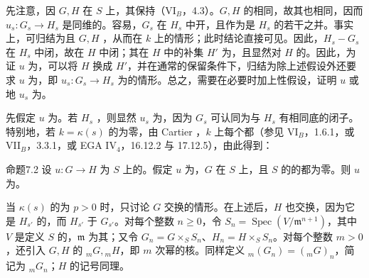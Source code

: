 先注意，因 $G,H$ 在 $S$ 上，其保持（VI$_B$，4.3）。$G,H$ 的相同，故其也相同，因而 $u_s:G_s\to H_s$ 是同维的。容易，$G_s$ 在 $H_s$ 中开，且作为是 $H_s$ 的若干之并。事实上，可归结为且 $G,H$ ，从而在 $k$ 上的情形；此时结论直接可见。因此，$H_s-G_s$ 在 $H_s$ 中闭，故在 $H$ 中闭；其在 $H$ 中的补集 $H'$ 为，且显然对 $H$ 的。因此，为证 $u$ 为，可以将 $H$ 换成 $H'$，并在通常的保留条件下，归结为除上述假设外还要求 $u$ 为，即 $u_s:G_s\to H_s$ 为的情形。总之，需要在必要时加上性假设，证明 $u$ 或地 $u_s$ 为。

先假定 $u$ 为。若 $H_s$ ，则显然 $u_s$ 为，因为 $G_s$ 可认同为与 $H_s$ 有相同底的闭子。特别地，若 $k=\kappa(s)$ 的为零，由 Cartier ，$k$ 上每个都（参见 VI$_B$，1.6.1，或 VII$_B$，3.3.1，或 EGA IV$_4$，16.12.2 与 17.12.5），由此得到：
\begin{SGAresult}{命题}{7.2}
设 $u:G\to H$ 为 $S$ 上的。假定 $u$ 为，$G$ 在 $S$ 上，且 $S$ 的的都为零。则 $u$ 为。
\end{SGAresult}
当 $\kappa(s)$ 的为 $p>0$ 时，只讨论 $G$ 交换的情形。在上述后，$H$ 也交换，因为它是 $H_{s'}$ 的，而 $H_{s'}$ 于 $G_{s'}$。对每个整数 $n\geq0$，令 $S_n=\operatorname{Spec}(V/\mathfrak m^{n+1})$，其中 $V$ 是定义 $S$ 的，$\mathfrak m$ 为其；又令 $G_n=G\times_SS_n$、$H_n=H\times_SS_n$。对每个整数 $m>0$，还引入 $G,H$ 的 ${}_mG,{}_mH$，即 $m$ 次幂的核。同样定义 ${}_m(G_n)=({}_mG)_n$，简记为 ${}_mG_n$；$H$ 的记号同理。

